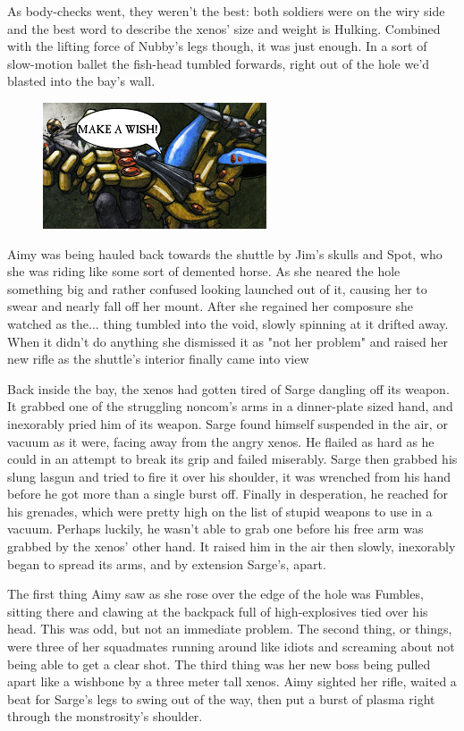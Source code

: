 As body-checks went, they weren't the best: 
both soldiers were on the wiry side and the best word to describe the xenos' size and weight is Hulking. 
Combined with the lifting force of Nubby's legs though, it was just enough. 
In a sort of slow-motion ballet the fish-head tumbled forwards, right out of the hole we'd blasted into the bay's wall.

\begin{figure}
	\begin{center}
		\includegraphics[width=\figwidth]{pics/11/53.png}
	\end{center}
\end{figure}
Aimy was being hauled back towards the shuttle by Jim's skulls and Spot, who she was riding like some sort of demented horse. 
As she neared the hole something big and rather confused looking launched out of it, causing her to swear and nearly fall off her mount. 
After she regained her composure she watched as the... 
thing tumbled into the void, slowly spinning at it drifted away. 
When it didn't do anything she dismissed it as "not her problem" and raised her new rifle as the shuttle's interior finally came into view

Back inside the bay, the xenos had gotten tired of Sarge dangling off its weapon. 
It grabbed one of the struggling noncom's arms in a dinner-plate sized hand, and inexorably pried him of its weapon. 
Sarge found himself suspended in the air, or vacuum as it were, facing away from the angry xenos. 
He flailed as hard as he could in an attempt to break its grip and failed miserably. 
Sarge then grabbed his slung lasgun and tried to fire it over his shoulder, it was wrenched from his hand before he got more than a single burst off. 
Finally in desperation, he reached for his grenades, which were pretty high on the list of stupid weapons to use in a vacuum. 
Perhaps luckily, he wasn't able to grab one before his free arm was grabbed by the xenos' other hand. 
It raised him in the air then slowly, inexorably began to spread its arms, and by extension Sarge's, apart.

The first thing Aimy saw as she rose over the edge of the hole was Fumbles, sitting there and clawing at the backpack full of high-explosives tied over his head. 
This was odd, but not an immediate problem. 
The second thing, or things, were three of her squadmates running around like idiots and screaming about not being able to get a clear shot. 
The third thing was her new boss being pulled apart like a wishbone by a three meter tall xenos. 
Aimy sighted her rifle, waited a beat for Sarge's legs to swing out of the way, then put a burst of plasma right through the monstrosity's shoulder.

